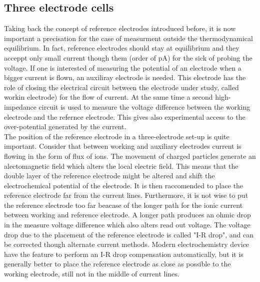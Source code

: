 \subsection{Three electrode cells}
Taking back the concept of reference electrodes introduced before, it is now important a precisation for the case of measurment outside the thermodynamical equilibrium. In fact, reference electrodes should stay at equilibrium and they acceppt only small current though them (order of pA) for the sick of probing the voltage. If one is interested of measuring the potential of an electrode when a bigger current is flown, an auxiliray electrode is needed. This electrode has the role of closing the electrical circuit between the electrode under study, called workin electrode) for the flow of current. At the same time a second high-impedance circuit is used to measure the voltage difference between the working electrode and the refernce electrode. This gives also experimental access to the over-potential generated by the current.\\
The position of the reference electrode in a three-electrode set-up is quite important. Consider that between working and auxiliary electrodes current is flowing in the form of flux of ions. The movement of charged particles generate an alectomagnetic field which alters the local electric field. This means that the double layer of the reference electrode might be altered and shift the electrochemical potential of the electrode. It is then raccomended to place the reference electrode far from the current lines. Furthermore, it is not wise to put the reference electrode too far beacase of the longer path for the ionic current between working and reference electrode. A longer path produces an ohmic drop in the measure voltage difference which also alters read out voltage. The voltage drop due to the placement of the reference electrode is called "I-R drop", and can be corrected though alternate current methods. Modern electrochemistry device have the feature to perform an I-R drop compensation automatically, but it is generally better to place the reference electrode as close as possible to the working electrode, still not in the middle of current lines.

